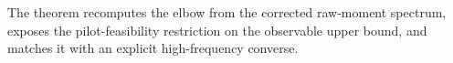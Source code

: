 The theorem recomputes the elbow from the corrected raw-moment spectrum, exposes the pilot-feasibility restriction on the observable upper bound, and matches it with an explicit high-frequency converse.